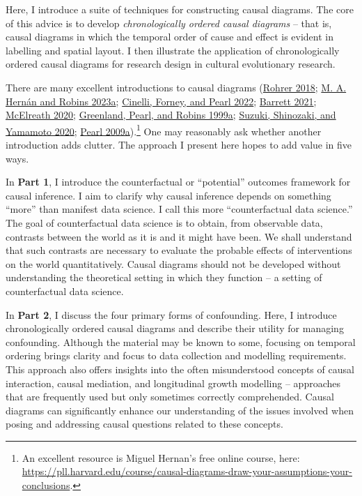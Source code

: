 \documentclass[
  singlecolumn]{report}
\begin{document}
Here, I introduce a suite of techniques for constructing causal
diagrams. The core of this advice is to develop \emph{chronologically
ordered causal diagrams} -- that is, causal diagrams in which the
temporal order of cause and effect is evident in labelling and spatial
layout. I then illustrate the application of chronologically ordered
causal diagrams for research design in cultural evolutionary research.

There are many excellent introductions to causal diagrams
(\protect\hyperlink{ref-rohrer2018}{Rohrer 2018};
\protect\hyperlink{ref-hernuxe1n2023a}{M. A. Hernán and Robins 2023a};
\protect\hyperlink{ref-cinelli2022}{Cinelli, Forney, and Pearl 2022};
\protect\hyperlink{ref-barrett2021}{Barrett 2021};
\protect\hyperlink{ref-mcelreath2020}{McElreath 2020};
\protect\hyperlink{ref-greenland1999}{Greenland, Pearl, and Robins
1999a}; \protect\hyperlink{ref-suzuki2020}{Suzuki, Shinozaki, and
Yamamoto 2020}; \protect\hyperlink{ref-pearl2009}{Pearl
2009a}).\footnote{An excellent resource is Miguel Hernan's free online
  course, here:
  \url{https://pll.harvard.edu/course/causal-diagrams-draw-your-assumptions-your-conclusions}.}
One may reasonably ask whether another introduction adds clutter. The
approach I present here hopes to add value in five ways.

In \textbf{Part 1}, I introduce the counterfactual or ``potential''
outcomes framework for causal inference. I aim to clarify why causal
inference depends on something ``more'' than manifest data science. I
call this more ``counterfactual data science.'' The goal of
counterfactual data science is to obtain, from observable data,
contrasts between the world as it is and it might have been. We shall
understand that such contrasts are necessary to evaluate the probable
effects of interventions on the world quantitatively. Causal diagrams
should not be developed without understanding the theoretical setting in
which they function -- a setting of counterfactual data science.

In \textbf{Part 2}, I discuss the four primary forms of confounding.
Here, I introduce chronologically ordered causal diagrams and describe
their utility for managing confounding. Although the material may be
known to some, focusing on temporal ordering brings clarity and focus to
data collection and modelling requirements. This approach also offers
insights into the often misunderstood concepts of causal interaction,
causal mediation, and longitudinal growth modelling -- approaches that
are frequently used but only sometimes correctly comprehended. Causal
diagrams can significantly enhance our understanding of the issues
involved when posing and addressing causal questions related to these
concepts.
\end{document}
